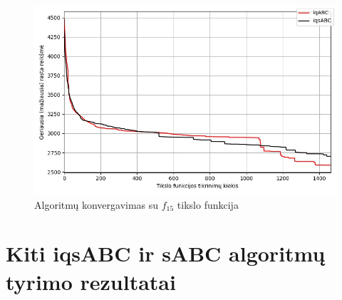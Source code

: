 \documentclass{VUMIFPSmagistrinis}
\begin{document}
\begin{landscape}
\begin{figure}[H]
    \centering
    \includegraphics[scale=0.5]{img/2kg/f15.jpg}
    \caption{Algoritmų konvergavimas su $f_{15}$ tikslo funkcija}
    \label{img:vkonf15}
\end{figure}

\end{landscape}








\section{Kiti iqsABC ir sABC algoritmų tyrimo rezultatai}\label{PR2eff}
\end{document}
